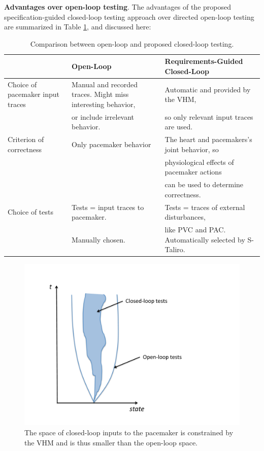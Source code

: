 \textbf{Advantages over open-loop testing}.
The advantages of the proposed specification-guided closed-loop testing approach over directed open-loop testing are summarized in Table \ref{table:CLoverOL}, and discussed here:
\begin{table}
	\centering
	\caption{Comparison between open-loop and proposed closed-loop testing.}
	\begin{tabular}{|l|l|l|}
	\hline                       & Open-Loop    & Requirements-Guided Closed-Loop 
	\\ 
	\hline Choice of pacemaker input traces  
	                & Manual and recorded traces. Might miss interesting behavior, &  Automatic and provided by the VHM,
	\\ 
					& or include irrelevant behavior. &  so only relevant input traces are used.
	\\
	\hline Criterion of correctness    & Only pacemaker behavior & The heart and pacemakers's joint behavior, so 
	\\
	                &                  & physiological effects of pacemaker actions
	\\
	                &                  &  can be used to determine correctness.                   
	\\ 
	\hline Choice of tests & Tests = input traces to pacemaker.  & Tests = traces of external disturbances, 
	\\
	                & Manually chosen.  & like PVC and PAC. Automatically selected by S-Taliro.
	\\
	\hline 
\end{tabular}
\label{table:CLoverOL}
\end{table}

\begin{figure}[t]
\centering
\includegraphics[scale=0.4]{figures/cone}
\caption{The space of closed-loop inputs to the pacemaker is constrained by the VHM and is thus smaller than the open-loop space.}
\label{fig:cone}
\end{figure}

